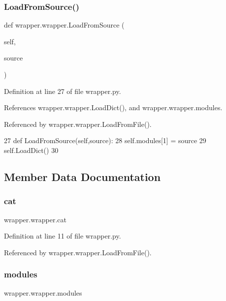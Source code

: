 \subsubsection{\texorpdfstring{Load\+From\+Source()}{LoadFromSource()}}
{\footnotesize\ttfamily def wrapper.\+wrapper.\+Load\+From\+Source (\begin{DoxyParamCaption}\item[{}]{self,  }\item[{}]{source }\end{DoxyParamCaption})}



Definition at line 27 of file wrapper.\+py.



References wrapper.\+wrapper.\+Load\+Dict(), and wrapper.\+wrapper.\+modules.



Referenced by wrapper.\+wrapper.\+Load\+From\+File().


\begin{DoxyCode}
27     \textcolor{keyword}{def }LoadFromSource(self,source):
28         self.modules[1] = source
29         self.LoadDict()
30 
\end{DoxyCode}


\subsection{Member Data Documentation}
\mbox{\label{classwrapper_1_1wrapper_ab0c2277e5f957e77c3502085b5629c2c}} 
\subsubsection{\texorpdfstring{cat}{cat}}
{\footnotesize\ttfamily wrapper.\+wrapper.\+cat}



Definition at line 11 of file wrapper.\+py.



Referenced by wrapper.\+wrapper.\+Load\+From\+File().

\mbox{\label{classwrapper_1_1wrapper_a59acff5098966e96d4ab251cde101735}} 
\subsubsection{\texorpdfstring{modules}{modules}}
{\footnotesize\ttfamily wrapper.\+wrapper.\+modules}



